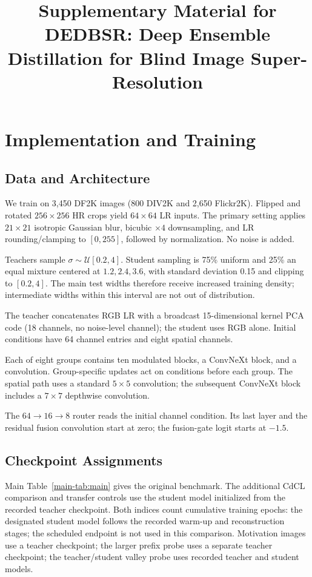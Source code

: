 \documentclass[10pt,journal,letterpaper]{IEEEtran}
\title{Supplementary Material for DEDBSR: Deep Ensemble Distillation for Blind Image Super-Resolution}
\begin{document}
\maketitle


\section{Implementation and Training}
\label{sec:supp_impl}
\subsection{Data and Architecture}
We train on 3,450 DF2K images (800 DIV2K and 2,650 Flickr2K). Flipped and rotated $256\times256$ HR crops yield $64\times64$ LR inputs. The primary setting applies $21\times21$ isotropic Gaussian blur, bicubic $\times4$ downsampling, and LR rounding/clamping to $[0,255]$, followed by normalization. No noise is added.

Teachers sample $\sigma\sim\mathcal U[0.2,4]$. Student sampling is 75\% uniform and 25\% an equal mixture centered at $1.2,2.4,3.6$, with standard deviation 0.15 and clipping to $[0.2,4]$. The main test widths therefore receive increased training density; intermediate widths within this interval are not out of distribution.

The teacher concatenates RGB LR with a broadcast 15-dimensional kernel PCA code (18 channels, no noise-level channel); the student uses RGB alone. Initial conditions have 64 channel entries and eight spatial channels.

Each of eight groups contains ten modulated blocks, a ConvNeXt block, and a convolution. Group-specific updates act on conditions before each group. The spatial path uses a standard $5\times5$ convolution; the subsequent ConvNeXt block includes a $7\times7$ depthwise convolution.

The $64\!\rightarrow\!16\!\rightarrow\!8$ router reads the initial channel condition. Its last layer and the residual fusion convolution start at zero; the fusion-gate logit starts at $-1.5$.

\subsection{Checkpoint Assignments}
Main Table~\ref{main-tab:main} gives the original benchmark. The additional CdCL comparison and transfer controls use the student model initialized from the recorded teacher checkpoint. Both indices count cumulative training epochs: the designated student model follows the recorded warm-up and reconstruction stages; the scheduled endpoint is not used in this comparison. Motivation images use a teacher checkpoint; the larger prefix probe uses a separate teacher checkpoint; the teacher/student valley probe uses recorded teacher and student models.
\end{document}
